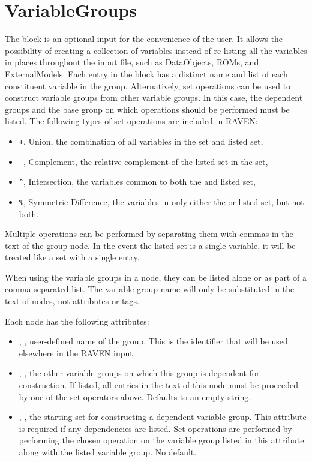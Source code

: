 \section{VariableGroups}
\label{sec:VariableGroups}

The  block is an optional input for the convenience of the user.  It allows the
possibility of creating a collection of variables instead of re-listing all the variables in places throughout
the input file, such as DataObjects, ROMs, and ExternalModels.
%
Each entry in the  block has a distinct name and list of each constituent variable in
the group.
%
Alternatively, set operations can be used to construct variable groups from other variable groups.  In this case,
the dependent groups and the base group on which operations should be performed must be listed.  The following types of
set operations are included in RAVEN:
\begin{itemize}
  \item \texttt{+}, Union, the combination of all variables in the  set and listed set,
  \item \texttt{-}, Complement, the relative complement of the listed set in the  set,
  \item \texttt{\^}, Intersection, the variables common to both the  and listed set,
  \item \texttt{\%}, Symmetric Difference, the variables in only either the  or listed set,
    but not both.
\end{itemize}
Multiple operations can be performed by separating them with commas in the text of the group node.  In the
event the listed set is a single variable, it will be treated like a set with a single entry.

When using the variable groups in a node, they can be listed alone or as part of a comma-separated list.  The
variable group name will only be substituted in the text of nodes, not attributes or tags.

Each  node has the following attributes:
\vspace{-5mm}
\begin{itemize}
  \itemsep0em
  \item {}, , user-defined name
  of the group. This is the identifier that will be used elsewhere in the RAVEN input. 
  \item {}, , the other variable groups 
    on which this group is dependent for construction.  If listed, all entries in the text of this node must 
    be proceeded by one of the set operators above.  Defaults to an empty string.
  \item {}, , the starting set for constructing a dependent
    variable group.  This attribute is required if any dependencies are listed.  Set operations are performed
    by performing the chosen operation on the variable group listed in this attribute along with the listed
    variable group.  No default.
\end{itemize}
\vspace{-5mm}

